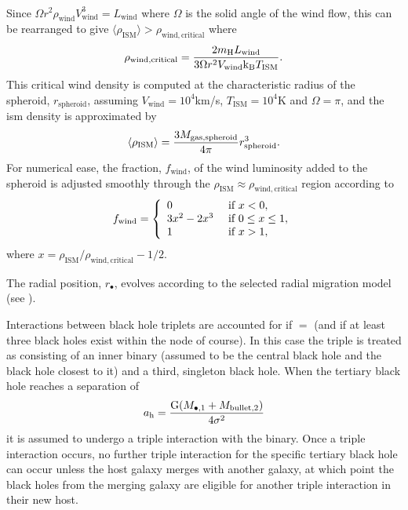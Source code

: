 \begin{description}
\begin{eqnarray}
\end{eqnarray}
Since $\Omega r^2 \rho_\mathrm{wind} V_\mathrm{wind}^3 = L_\mathrm{wind}$ where $\Omega$ is the solid angle of the wind flow, this can be rearranged to give $\langle\rho_\mathrm{ISM}\rangle > \rho_\mathrm{wind, critical}$ where
\begin{equation}
\rho_\mathrm{wind,critical} = {2 m_\mathrm{H} L_\mathrm{wind} \over 3 \Omega r^2 V_\mathrm{wind} \mathrm{k_B} T_\mathrm{ISM}}.
\end{equation}
This critical wind density is computed at the characteristic radius of the spheroid, $r_\mathrm{spheroid}$, assuming $V_\mathrm{wind}=10^4$km/s, $T_\mathrm{ISM}=10^4$K and $\Omega=\pi$, and the \gls{ism} density is approximated by
\begin{equation}
 \langle\rho_\mathrm{ISM}\rangle = {3 M_\mathrm{gas, spheroid} \over 4 \pi} r_\mathrm{spheroid}^3.
\end{equation}
For numerical ease, the fraction, $f_\mathrm{wind}$, of the wind luminosity added to the spheroid is adjusted smoothly through the $\rho_\mathrm{ISM}\approx\rho_\mathrm{wind,critical}$ region according to
\begin{equation}
 f_\mathrm{wind} = \left\{ \begin{array}{ll} 0 & \hbox{ if } x < 0, \\ 3x^2-2x^3 & \hbox{ if } 0 \le x \le 1, \\ 1 & \hbox{ if } x > 1, \end{array} \right.
\end{equation}
where $x=\rho_\mathrm{ISM}/\rho_\mathrm{wind,critical}-1/2$.
\end{description}

The radial position, $r_\bullet$, evolves according to the selected radial migration model (see ).

Interactions between black hole triplets are accounted for if \mono{[tripleBlackHoleInteraction]}$=$ (and if at least three black holes exist within the \gls{node} of course). In this case the triple is treated as consisting of an inner binary (assumed to be the central black hole and the black hole closest to it) and a third, singleton black hole. When the tertiary black hole reaches a separation of 
\begin{equation}
a_\mathrm{h}= {\mathrm{G} (M_{\bullet, 1} + M_\mathrm{bullet, 2}) \over 4 \sigma^2}
\end{equation}
it is assumed to undergo a triple interaction with the binary. Once a triple interaction occurs, no further triple interaction for the specific tertiary black hole can occur unless the host galaxy merges with another galaxy, at which point the black holes from the merging galaxy are eligible for another triple interaction in their new host.

